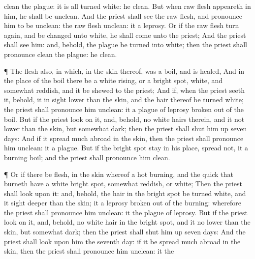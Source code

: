 {{}
clean
{} the
plague: it is all
turned
white: he
{}
clean.
But
when
raw
flesh
appeareth in him, he shall be
unclean.
And the
priest shall
see the
raw
flesh, and pronounce him to be
unclean:
{} the
raw
flesh
{}
unclean: it
{} a
leprosy.
Or if the
raw
flesh turn
again, and be
changed unto
white, he shall
come unto the
priest;
And the
priest shall
see him: and, behold,
{} the
plague be
turned into
white; then the
priest shall pronounce
{}
clean
{} the
plague: he
{}
clean.
\par }{\PP {}¶ The
flesh also, in
which,
{} in the
skin thereof, was a
boil, and is
healed,
And in the
place of the
boil there be a
white
rising, or a bright
spot,
white, and somewhat
reddish, and it be
shewed to the
priest;
And if, when the
priest
seeth it, behold, it
{} in
sight
lower than the
skin, and the
hair thereof be
turned
white; the
priest shall pronounce him
unclean: it
{} a
plague of
leprosy
broken out of the
boil.
But if the
priest
look on it, and, behold,
{} no
white
hairs therein, and
{} it
{} not
lower than the
skin, but
{} somewhat
dark; then the
priest shall
shut him up
seven
days:
And if it spread
much
abroad in the
skin, then the
priest shall pronounce him
unclean: it
{} a
plague.
But if the bright
spot
stay in his place,
{}
spread not, it
{} a
burning
boil; and the
priest shall pronounce him
clean.
\par }{\PP {}¶ Or if there be
{}
flesh, in the
skin whereof
{} a
hot
burning, and the
quick
{} that
burneth have a
white bright
spot, somewhat
reddish, or
white;
Then the
priest shall
look upon it: and, behold,
{} the
hair in the bright
spot be
turned
white, and it
{}
sight
deeper than the
skin; it
{} a
leprosy
broken out of the
burning: wherefore the
priest shall pronounce him
unclean: it
{} the
plague of
leprosy.
But if the
priest
look on it, and, behold,
{} no
white
hair in the bright
spot, and it
{} no
lower than the
{}
skin, but
{} somewhat
dark; then the
priest shall
shut him up
seven
days:
And the
priest shall
look upon him the
seventh
day:
{} if it be spread
much
abroad in the
skin, then the
priest shall pronounce him
unclean: it
{} the
}
